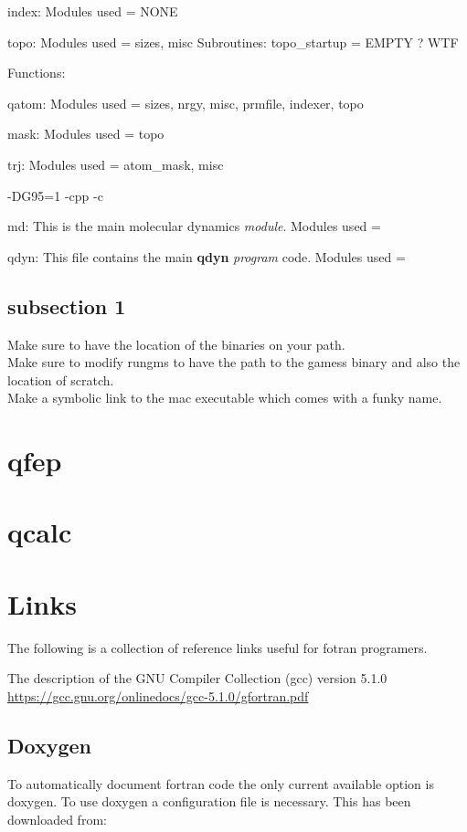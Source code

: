 \documentclass[10pt, oneside, pdftex]{article}
\begin{document}
index:
Modules used = NONE


topo:
Modules used = sizes, misc
Subroutines: 
  topo\_startup = EMPTY ? WTF


Functions:


qatom:
Modules used = sizes, nrgy, misc, prmfile, indexer, topo


mask:
Modules used = topo


trj:
Modules used = atom\_mask, misc




-DG95=1 -cpp -c

md: This is the main molecular dynamics \textit{module}.
Modules used = 


qdyn: This file contains the main \textbf{qdyn} \textit{program} code.
Modules used = 




\subsection{subsection 1}

Make sure to have the location of the binaries on your path.\\

\noindent
Make sure to modify rungms to have the path to the gamess binary and
also the location of scratch.\\

\noindent
Make a  symbolic link to the  mac executable which comes  with a funky
name.

\section{qfep}


\section{qcalc}

\section{Links}
The following  is a  collection of reference  links useful  for fotran
programers.

The description of the GNU Compiler Collection (gcc) version 5.1.0
\url{https://gcc.gnu.org/onlinedocs/gcc-5.1.0/gfortran.pdf}


\subsection{Doxygen}
To  automatically document  fortran  code the  only current  available
option is doxygen.
To  use doxygen  a  configuration  file is  necessary.  This has  been
downloaded from:\\
\end{document}
